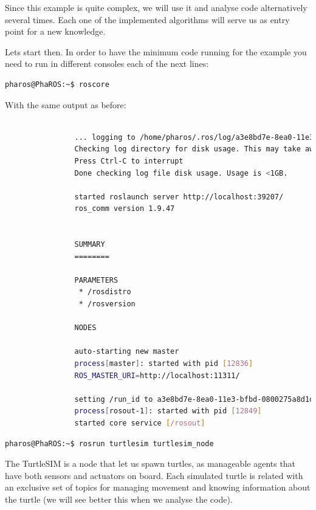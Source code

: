 \documentclass[a4paper,10pt,twoside]{book}
\begin{document}
			Since this example is quite complex, we will use it and analyse code alternatively several times. Each one of the implemented algorithms will serve us as entry point for a new knowledge. 
			
			
			Lets start then. 
			In order to have the minimum code running for the example you need to run in different consoles each of the next lines: 
			
			
			\begin{lstlisting}[language=bash,title={Starting up ROS}]
				pharos@PhaROS:~$ roscore
			\end{lstlisting}
			
			With the same output as before:
			
			\begin{lstlisting}[language=bash,title={Starting up ROS - Output}]
				
				... logging to /home/pharos/.ros/log/a3e8bd7e-8ea0-11e3-bfbd-0800275a8d1d/roslaunch-PhaROS-12822.log
				Checking log directory for disk usage. This may take awhile.
				Press Ctrl-C to interrupt
				Done checking log file disk usage. Usage is <1GB.

				started roslaunch server http://localhost:39207/
				ros_comm version 1.9.47


				SUMMARY
				========

				PARAMETERS
				 * /rosdistro
				 * /rosversion

				NODES

				auto-starting new master
				process[master]: started with pid [12836]
				ROS_MASTER_URI=http://localhost:11311/

				setting /run_id to a3e8bd7e-8ea0-11e3-bfbd-0800275a8d1d
				process[rosout-1]: started with pid [12849]
				started core service [/rosout]
			\end{lstlisting}
			
			
			
			\begin{lstlisting}[language=bash,title={Starting up TurtleSIM}]
				pharos@PhaROS:~$ rosrun turtlesim turtlesim_node
			\end{lstlisting}
			
			
				The TurtleSIM is a node that let us spawn turtles, as manageable agents that have both sensors and actuators on board. 
				Each simulated turtle is related with an exclusive set of topics for managing movement and knowing information about the turtle (we will see better this when we analyse the code). 
				
\end{document}

